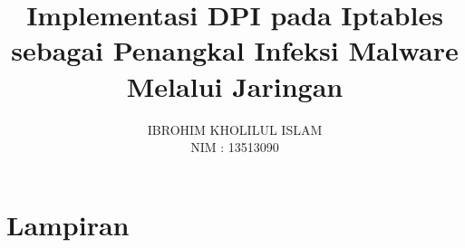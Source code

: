 \documentclass[12pt, a4paper, onecolumn, oneside, final, bahasa]{report}
\begin{document}
\title{Implementasi DPI pada Iptables sebagai Penangkal Infeksi Malware Melalui Jaringan}
\date{}
\author{IBROHIM KHOLILUL ISLAM\\
NIM : 13513090}




\setcounter{page}{0}

\pagestyle{plain}



\clearpage

\tableofcontents
\clearpage
\listoffigures
\clearpage
\listoftables
\clearpage

\setcounter{page}{1}












\printbibliography

\appendix
{}
\part*{Lampiran}



\end{document}
